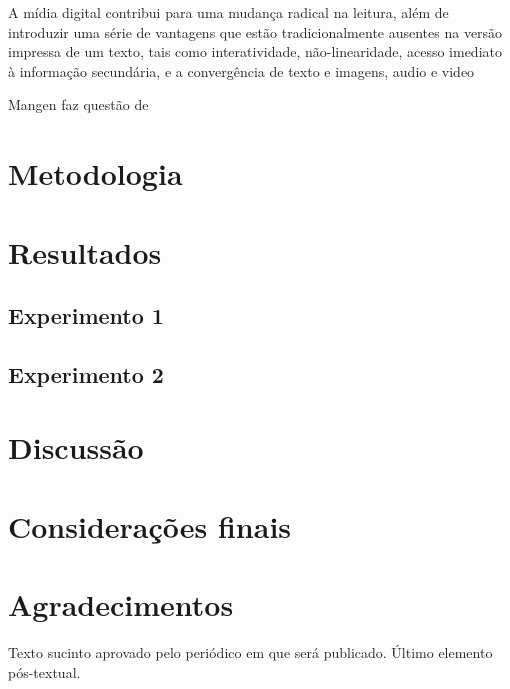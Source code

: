 \documentclass[
	article,			%
	11pt,				%
	oneside,			%
	a4paper,			%
	english,			%
	brazil,				%
	sumario=tradicional
	]{abntex2}
\begin{document}
A mídia digital contribui para uma mudança radical na leitura, além de introduzir uma série de vantagens que estão tradicionalmente ausentes na versão impressa de um texto, tais como interatividade, não-linearidade, acesso imediato à informação secundária, e a convergência de texto e imagens, audio e video \cite{Liu2005}

 	Mangen faz questão de 


\section{Metodologia}

\lipsum[55-55]

\section{Resultados}

\subsection{Experimento 1}

\lipsum[55]

\subsection{Experimento 2}

\lipsum[55]

\section{Discussão}

\lipsum[55]
% 

\section{Considerações finais}

\lipsum[1]

\begin{citacao}
\lipsum[2]
\end{citacao}

\lipsum[3]

\postextual






\section*{Agradecimentos}
Texto sucinto aprovado pelo periódico em que será publicado. Último 
elemento pós-textual.
\end{document}
